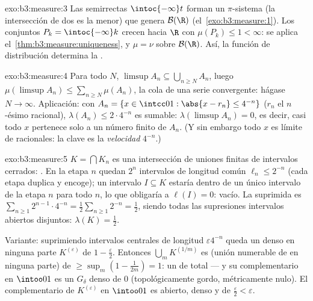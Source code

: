 \begin{solution}{exo:b3:measure:3}
Las semirrectas $\intoc{-\infty}t$ forman un $\pi$-sistema (la
intersección de dos es la menor) que genera $\mathcal B(\R)$
(el~\cref{exo:b3:measure:1}). Los conjuntos $P_k = \intoc{-\infty}k$
crecen hacia $\R$ con $\mu(P_k) \leq 1 < \infty$: se aplica
el~\cref{thm:b3:measure:uniqueness}, y $\mu = \nu$ sobre
$\mathcal B(\R)$. Así, la función de distribución determina la
.
\end{solution}

\begin{solution}{exo:b3:measure:4}
Para todo $N$, $\limsup A_n \subseteq \bigcup_{n \geq N}A_n$, luego
$\mu(\limsup A_n) \leq \sum_{n\geq N}\mu(A_n)$, la cola de una serie
convergente: hágase $N \to \infty$. Aplicación: con
$A_n = \{x \in \intcc01 : \abs{x - r_n} \leq 4^{-n}\}$
($r_n$ el $n$-ésimo racional), $\lambda(A_n) \leq 2\cdot4^{-n}$ es
sumable: $\lambda(\limsup A_n) = 0$, es decir, casi todo $x$ pertenece
solo a un número finito de $A_n$. (Y sin embargo todo $x$ es límite de
racionales: la clave es la \emph{velocidad} $4^{-n}$.)
\end{solution}

\begin{solution}{exo:b3:measure:5}
$K = \bigcap K_n$ es una intersección de uniones finitas de intervalos
cerrados: . En la etapa $n$
quedan $2^n$ intervalos de longitud común $\ell_n \leq 2^{-n}$ (cada
etapa duplica y encoge); un intervalo $I \subseteq K$ estaría dentro de
un único intervalo de la etapa $n$ para todo $n$, lo que obligaría a
$\ell(I) = 0$:  vacío. La
 suprimida es
$\sum_{n\geq1}2^{n-1}\cdot
4^{-n} = \frac12\sum_{n\geq1}2^{-n} = \frac12$, siendo todas las
supresiones intervalos abiertos disjuntos: $\lambda(K) = \frac12$.

Variante: suprimiendo intervalos centrales de longitud $\varepsilon
4^{-n}$ queda un  denso en
ninguna parte $K^{(\varepsilon)}$ de
 $1 - \frac\varepsilon2$.
Entonces $\bigcup_m
K^{(1/m)}$ es  (unión numerable de
 en ninguna parte) de
$\geq \sup_m(1 - \frac1{2m}) = 1$: un
 de
 total --- y su complementario en
$\intoo01$ es un $G_\delta$ denso de
 $0$
(topológicamente gordo, métricamente
nulo). El complementario de $K^{(\varepsilon)}$ en $\intoo01$ es
abierto, denso y de 
$\frac\varepsilon2 < \varepsilon$.
\end{solution}

